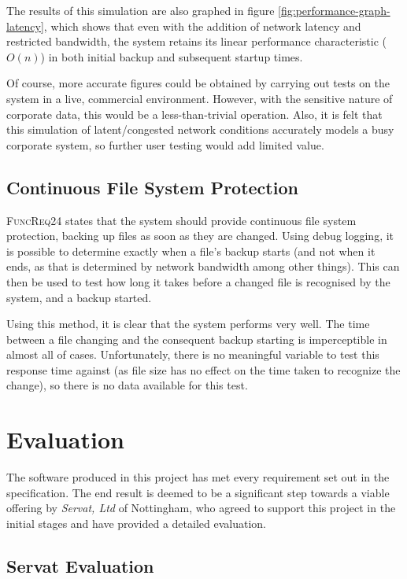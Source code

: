 The results of this simulation are also graphed in figure
\ref{fig:performance-graph-latency}, which shows that even with the addition of
network latency and restricted bandwidth, the system retains its linear
performance characteristic ($O(n)$) in both initial backup and subsequent
startup times.

Of course, more accurate figures could be obtained by carrying out tests on the
system in a live, commercial environment. However, with the sensitive nature of
corporate data, this would be a less-than-trivial operation. Also, it is felt
that this simulation of latent/congested network conditions accurately models
a busy corporate system, so further user testing would add limited value.

\subsection{Continuous File System Protection}

\textsc{FuncReq24} states that the system should provide continuous file system
protection, backing up files as soon as they are changed. Using debug logging,
it is possible to determine exactly when a file's backup starts (and not when
it ends, as that is determined by network bandwidth among other things). This
can then be used to test how long it takes before a changed file is recognised
by the system, and a backup started.

Using this method, it is clear that the system performs very well. The time
between a file changing and the consequent backup starting is imperceptible in
almost all of cases. Unfortunately, there is no meaningful variable to test
this response time against (as file size has no effect on the time taken to
recognize the change), so there is no data available for this test.

\section{Evaluation}

The software produced in this project has met every requirement set out in the
specification. The end result is deemed to be a significant step towards
a viable offering by \emph{Servat, Ltd} of Nottingham, who agreed to support
this project in the initial stages and have provided a detailed evaluation.

\subsection{Servat Evaluation}

